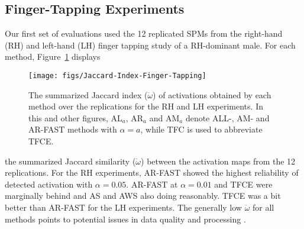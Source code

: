 \subsection{Finger-Tapping Experiments}
Our first set of evaluations used the 12 replicated SPMs 
\citet{maitraetal02,maitra09b} 
from the right-hand (RH) and left-hand (LH) finger tapping
study  of a RH-dominant male.
For each method, Figure~\ref{fig:jaccard.index.finger} displays
\begin{figure}[h]
  \centering
\texttt{[image: figs/Jaccard-Index-Finger-Tapping]}
\caption{The summarized Jaccard index ($\ddot\omega$) of activations obtained by
  each method over the replications for the RH and LH
    experiments. In this and other figures, AL$_a$, AR$_a$ and
    AM$_a$ denote ALL-, AM- and AR-FAST methods with $\alpha = a$, while
    TFC is used to abbreviate TFCE.}
  \label{fig:jaccard.index.finger}
\end{figure}
the summarized Jaccard similarity ($\ddot\omega$) between the
activation maps from the 12 replications. %
For the RH experiments, AR-FAST showed the highest reliability of
detected activation with $\alpha=0.05$. AR-FAST at $\alpha=0.01$ 
and TFCE were marginally behind and AS and AWS also doing reasonably. TFCE
was a bit better than AR-FAST for the LH experiments. 
The generally low $\ddot\omega$ for all methods points to potential issues in data  quality and processing
\citep{maitra10}.

